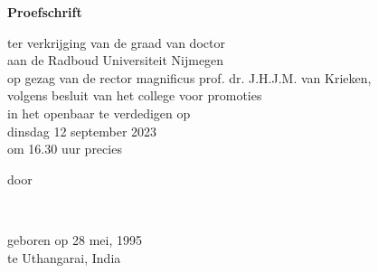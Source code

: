 \begin{titlepage}
    
    \begin{center}


        \vspace*{2\bigskipamount}

        {\makeatletter
            \titlestyle\bfseries\LARGE\@title
            \makeatother}

        {\makeatletter
            \ifx\@subtitle\undefined\else
                \bigskip
                \titlefont\titleshape\Large\@subtitle
            \fi
            \makeatother}

        \vfill


        {\Large\titlefont\bfseries Proefschrift}

        \bigskip
        \bigskip

        ter verkrijging van de graad van doctor\\
        aan de Radboud Universiteit Nijmegen\\
        op gezag van de rector magnificus prof. dr. J.H.J.M. van Krieken,\\
        volgens besluit van het college voor promoties\\
        in het openbaar te verdedigen op\\

        \bigskip
        dinsdag 12 september 2023\\
        om 16.30 uur precies\\
        \bigskip
        \bigskip

        door
        \bigskip
        \bigskip

        \makeatletter
        {\Large\titlefont\bfseries\@firstnames\ \@lastname}
        \makeatother

        \bigskip
        \bigskip

        geboren op 28 mei, 1995\\
        te Uthangarai, India\\

        \vspace*{2\bigskipamount}


\end{center}
\end{titlepage}

